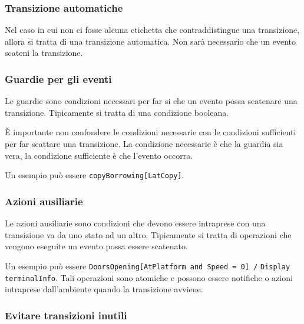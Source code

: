 \subsubsection{Transizione automatiche}
Nel caso in cui non ci fosse alcuna etichetta che contraddistingue una transizione,
allora si tratta di una transizione automatica. Non sarà necessario che un evento
scateni la transizione.
\begin{figure}[H]
    \centering
\end{figure}
\subsubsection{Guardie per gli eventi}
Le guardie sono condizioni necessari per far si che un evento possa 
scatenare una transizione. Tipicamente si tratta di una condizione booleana.

È importante non confondere le condizioni necessarie con le condizioni 
sufficienti per far scattare una transizione.
La condizione necessarie è che la guardia sia vera, la condizione sufficiente
è che l'evento occorra.

Un esempio può essere \texttt{copyBorrowing[LatCopy]}.
\subsubsection{Azioni ausiliarie}
Le azioni ausiliarie sono condizioni che devono essere intraprese con una transizione 
va da uno stato ad un altro. Tipicamente si tratta di operazioni che vengono eseguite
un evento possa essere scatenato.

Un esempio può essere \texttt{DoorsOpening[AtPlatform and Speed = 0] /}
\texttt{Display}\\\texttt{terminalInfo}.
Tali operazioni sono atomiche e possono essere notifiche o azioni intraprese dall'ambiente 
quando la transizione avviene.
\subsubsection{Evitare transizioni inutili}

